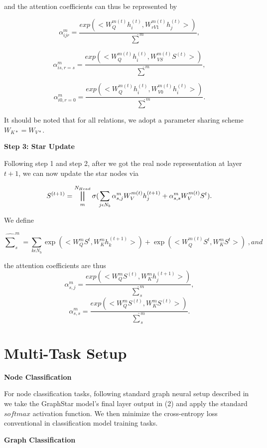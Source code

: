 \documentclass{article}
\begin{document}
and the attention coefficients can thus be represented by
 
\[
\alpha_{ijr}^m = \frac{exp(<W_Q^{m(t)}h_i^{(t)},W_{rV1}^{m(t)}h_j^{(t)}>)}{\hat{\sum}^m},
\]

\[
\alpha_{is,r=s}^m = \frac{exp(<W_Q^{m(t)}h_i^{(t)},W_{VS}^{m(t)}S^{(t)}>)}{\hat{\sum}^m},
\]

\[
\alpha_{i0,r=0}^m = \frac{exp(<W_Q^{m(t)}h_i^{(t)},W_{V0}^{m(t)}h_i^{(t)}>)}{\hat{\sum}^m}.
\]

It should be noted that for all relations, we adopt a parameter sharing scheme  \(W_{K*}=W_{V*}\).

\vspace{2mm}

\textbf{Step 3: Star Update}

Following step 1 and step 2, after we got the real node representation at layer \(t+1\), we can now update the star nodes via

\begin{equation}
S^{(t+1)} = \bigparallel_m^{N_{Head}}\sigma(\sum_{j\epsilon N_b} \alpha_{s,j}^m W_{V}^{m(t)} h_j^{(t+1)}+\alpha_{s,s}^m W_{V}^{m(t)} S^t).
\end{equation}

We define

\[\hat{\sum}_s^m = \sum_{k\epsilon N_b} \exp(<W_Q^{m} S^t,W_K^m h_k^{(t+1)}>) + \exp(<W_Q^{m(t)} S^t,W_K^m S^t>)\; ,and\]
\vspace{1mm}

the attention coefficients are thus
\[\alpha_{s,j}^m = \frac{exp(<W_Q^{m}S^{(t)},W_K^{m}h_j^{(t+1)}>)}{\hat{\sum}_s^m},\]
\[\alpha_{s,s}^m = \frac{exp(<W_Q^{m}S^{(t)},W_K^{m}S^{(t)}>)}{\hat{\sum}_s^m}.\]





\section{Multi-Task Setup}

\textbf{Node Classification}

For node classification tasks, following standard graph neural setup described in \cite{velivckovic2017graph,schlichtkrull2018modeling} we take the GraphStar model's final layer output in (2) and apply the standard \(softmax\) activation function. We then minimize the cross-entropy loss conventional in classification model training tasks.

\textbf{Graph Classification}
\end{document}
